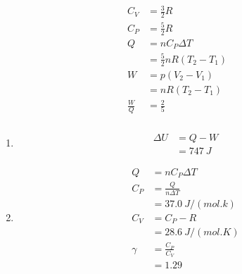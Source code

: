 \documentclass{article}
\begin{document}
\setcounter{subsubsection}{20}
\subsubsection{}

\begin{align*}
  C_V         & = \frac{3}{2} R               \\
  C_P         & = \frac{5}{2} R               \\
  Q           & = n C_P \Delta T              \\
              & = \frac{5}{2} n R (T_2 - T_1) \\
  W           & = p (V_2 - V_1)               \\
              & = n R (T_2 - T_1)             \\
  \frac{W}{Q} & = \frac{2}{5}
\end{align*}

\setcounter{subsubsection}{22}
\subsubsection{}

\begin{enumerate}
  \item

        \begin{align*}
          \Delta U & = Q - W        \\
                   & = \qty{747}{J}
        \end{align*}

  \item

        \begin{align*}
          Q      & = n C_P \Delta T        \\
          C_P    & = \frac{Q}{n \Delta T}  \\
                 & = \qty{37.0}{J/(mol.k)} \\
          C_V    & = C_P - R               \\
                 & = \qty{28.6}{J/(mol.K)} \\
          \gamma & = \frac{C_P}{C_V}       \\
                 & = 1.29
        \end{align*}
\end{enumerate}

\setcounter{subsubsection}{24}
\subsubsection{}
\end{document}
